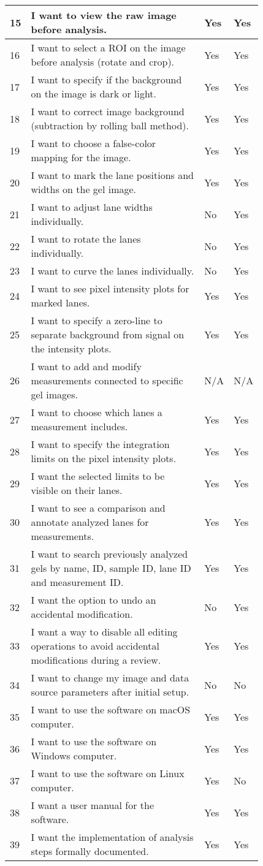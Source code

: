 \begin{longtable}[h!]{|p{0.02\linewidth} | p{0.7\linewidth} | p{0.05\linewidth}| p{0.05\linewidth}|}
15 & I want to view the raw image before analysis. & Yes & Yes\\ \hline
16 & I want to select a ROI on the image before analysis (rotate and crop). & Yes & Yes\\ \hline
17 & I want to specify if the background on the image is dark or light. & Yes & Yes\\ \hline
18 & I want to correct image background (subtraction by rolling ball method). & Yes & Yes\\ \hline
19 & I want to choose a false-color mapping for the image. & Yes & Yes\\ \hline
20 & I want to mark the lane positions and widths on the gel image. & Yes & Yes\\ \hline
21 & I want to adjust lane widths individually. & No & Yes\\ \hline
22 & I want to rotate the lanes individually. & No & Yes\\ \hline
23 & I want to curve the lanes individually. & No & Yes\\ \hline
24 & I want to see pixel intensity plots for marked lanes. & Yes & Yes\\ \hline
25 & I want to specify a zero-line to separate background from signal on the intensity plots. & Yes & Yes\\ \hline
26 & I want to add and modify measurements connected to specific gel images. & N/A & N/A\\ \hline 
27 & I want to choose which lanes a measurement includes. & Yes & Yes\\ \hline
28 & I want to specify the integration limits on the pixel intensity plots. & Yes & Yes\\ \hline
29 & I want the selected limits to be visible on their lanes. & Yes & Yes\\ \hline
30 & I want to see a comparison and annotate analyzed lanes for measurements. & Yes & Yes\\ \hline
31 & I want to search previously analyzed gels by name, ID, sample ID, lane ID and measurement ID. & Yes & Yes\\ \hline
32 & I want the option to undo an accidental modification. & No & Yes\\ \hline
33 & I want a way to disable all editing operations to avoid accidental modifications during a review. & Yes & Yes\\ \hline
34 & I want to change my image and data source parameters after initial setup. & No & No\\ \hline
35 & I want to use the software on macOS computer. & Yes & Yes\\ \hline
36 & I want to use the software on Windows computer. & Yes & Yes\\ \hline
37 & I want to use the software on Linux computer. & Yes & No\\ \hline
38 & I want a user manual for the software. & Yes & Yes\\ \hline
39 & I want the implementation of analysis steps formally documented. & Yes & Yes\\
\end{longtable}

